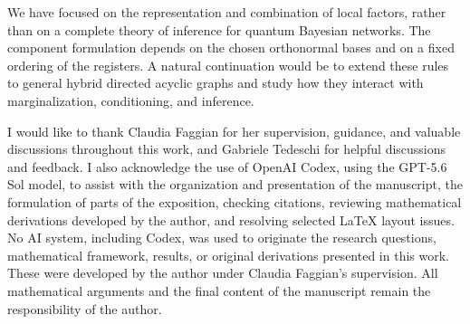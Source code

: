 \documentclass[
    aps,
    pra,
    reprint,
    superscriptaddress,
    nofootinbib
]{revtex4-2}
\theoremstyle{definition}
\theoremstyle{plain}
\begin{document}
We have focused on the representation and combination of local factors,
rather than on a complete theory of inference for quantum Bayesian networks.
The component formulation depends on the chosen orthonormal bases and on a
fixed ordering of the registers. A natural continuation would be to extend
these rules to general hybrid directed acyclic graphs and study how they
interact with marginalization, conditioning, and inference. 

\begin{acknowledgments}
I would like to thank Claudia Faggian for her supervision, guidance, and
valuable discussions throughout this work, and Gabriele Tedeschi for
helpful discussions and feedback. I also acknowledge the use of OpenAI
Codex, using the GPT-5.6 Sol model, to assist with the organization and
presentation of the manuscript, the formulation of parts of the exposition,
checking citations, reviewing mathematical derivations developed by the
author, and resolving selected \LaTeX{} layout issues. No AI system,
including Codex, was used to originate the research questions, mathematical
framework, results, or original derivations presented in this work. These
were developed by the author under Claudia Faggian's supervision. All
mathematical arguments and the final content of the manuscript remain the
responsibility of the author.
\end{acknowledgments}



\end{document}
